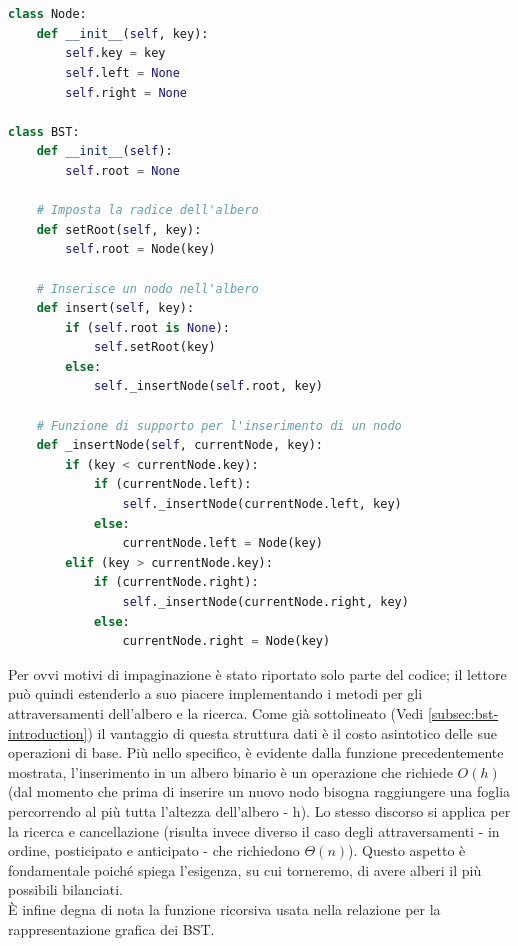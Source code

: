 \documentclass{article}
\begin{document}
\begin{lstlisting}[language=Python, caption={Implementazione di un BST}, label=bst-implementation]


class Node:
    def __init__(self, key):
        self.key = key
        self.left = None
        self.right = None

class BST:
    def __init__(self):
        self.root = None

    # Imposta la radice dell'albero
    def setRoot(self, key):
        self.root = Node(key)

    # Inserisce un nodo nell'albero
    def insert(self, key):
        if (self.root is None):
            self.setRoot(key)
        else:
            self._insertNode(self.root, key)

    # Funzione di supporto per l'inserimento di un nodo
    def _insertNode(self, currentNode, key):
        if (key < currentNode.key):
            if (currentNode.left):
                self._insertNode(currentNode.left, key)
            else:
                currentNode.left = Node(key)
        elif (key > currentNode.key):
            if (currentNode.right):
                self._insertNode(currentNode.right, key)
            else:
                currentNode.right = Node(key)
\end{lstlisting}

\vspace{5pt}

Per ovvi motivi di impaginazione è stato riportato solo parte del codice; il lettore può quindi estenderlo a suo piacere implementando i metodi per gli attraversamenti dell'albero e la ricerca.
Come già sottolineato (Vedi \ref{subsec:bst-introduction}) il vantaggio di questa struttura dati è il costo asintotico delle sue operazioni di base. Più nello specifico, è evidente dalla funzione precedentemente mostrata, l'inserimento in un albero binario è un operazione che richiede $O(h)$ (dal momento che prima di inserire un nuovo nodo bisogna raggiungere una foglia percorrendo al più tutta l'altezza dell'albero - h). Lo stesso discorso si applica per la ricerca e cancellazione (risulta invece diverso il caso degli attraversamenti - in ordine, posticipato e anticipato - che richiedono $\Theta(n)$).
Questo aspetto è fondamentale poiché spiega l'esigenza, su cui torneremo, di avere alberi il più possibili bilanciati. \\
È infine degna di nota la funzione ricorsiva usata nella relazione per la rappresentazione grafica dei BST.
\end{document}
